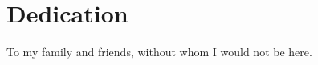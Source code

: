 \chapter{Dedication}

\vspace*{\fill}
\begin{center}
\begin{minipage}{.7\linewidth}

To my family and friends, without whom I would not be here.

\end{minipage}
\end{center}
\vfill %